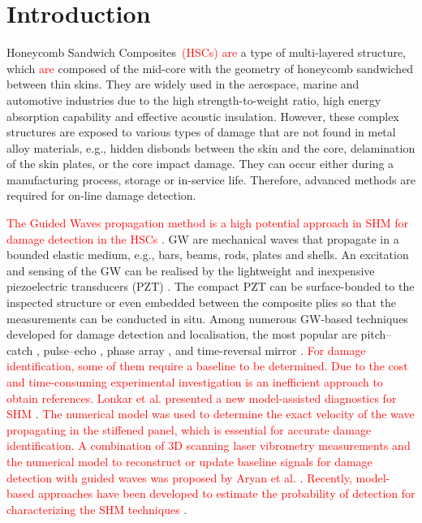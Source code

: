 \documentclass[sensors,article,submit,moreauthors,pdftex]{Definitions/mdpi}
\begin{document}
\section{Introduction}
\label{sec:intro}
Honeycomb Sandwich Composites~\textcolor{red}{(HSCs) are} a type of multi-layered structure, which \textcolor{red}{are} composed of the mid-core with the geometry of honeycomb sandwiched between thin skins.
They are widely used in the aerospace, marine and automotive industries due to the high strength-to-weight ratio, high energy absorption capability and effective acoustic insulation.
However, these complex structures are exposed to various types of damage that are not found in metal alloy materials, e.g., hidden disbonds between the skin and the core, delamination of the skin plates, or the core impact damage.
They can occur either during a manufacturing process, storage or in-service life.
Therefore, advanced methods are required for on-line damage detection.

\textcolor{red}{The Guided Waves propagation method is a high potential approach in SHM for damage detection in the HSCs} \cite{mustapha2011assessment, sikdar2016guided, sikdar2016ultrasonic,radzienski2016assessment, yu2019core}.
GW are mechanical waves that propagate in a bounded elastic medium, e.g., bars, beams, rods, plates and shells.
An excitation and sensing of the GW can be realised by the lightweight and inexpensive piezoelectric transducers (PZT) \cite{giurgiutiumicromechatronics}.
The compact PZT can be surface-bonded to the inspected structure or even embedded between the composite plies so that the measurements can be conducted in situ.
Among numerous GW-based techniques developed for damage detection and localisation, the most popular are pitch--catch \cite{ihn2008pitch, sikdar2017structural}, pulse--echo \cite{guo1993interaction, kudela2008damage}, phase array \cite{lu2006crack, ostachowicz2008elastic}, and time-reversal mirror \cite{fink1992time, eremin2016analytically}.
\textcolor{red}{For damage identification, some of them require a baseline to be determined.
Due to the cost and time-consuming experimental investigation is an inefficient approach to obtain references.
Lonkar et al. presented a new model-assisted diagnostics for SHM} \cite{lonkar2012model}.
\textcolor{red}{The numerical model was used to determine the exact velocity of the wave propagating in the stiffened panel, which is essential for accurate damage identification.
A combination of 3D scanning laser vibrometry measurements and the numerical model to reconstruct or update baseline signals for damage detection with guided waves was proposed by Aryan et al. }\cite{aryan2017formulation}.
\textcolor{red}{Recently, model-based approaches have been developed to estimate the probability of detection for characterizing the SHM techniques }\cite{janapati2016damage, moriot2018model, tschoke2021feasibility, gao2022model}.
 
\end{document}
